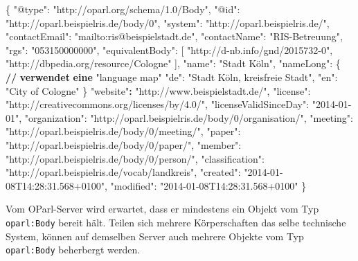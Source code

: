 \documentclass[,a4paper]{article}
\newenvironment{Shaded}{}{}
\newcommand{\DataTypeTok}[1]{\textcolor[rgb]{0.56,0.13,0.00}{{#1}}}
\newcommand{\StringTok}[1]{\textcolor[rgb]{0.25,0.44,0.63}{{#1}}}
\newcommand{\ErrorTok}[1]{\textcolor[rgb]{1.00,0.00,0.00}{\textbf{{#1}}}}
\newcommand{\NormalTok}[1]{{#1}}
\begin{document}
\begin{Shaded}
\begin{Highlighting}[]
\NormalTok{\{}
    \DataTypeTok{"@type"}\NormalTok{: }\StringTok{"http://oparl.org/schema/1.0/Body"}\NormalTok{,}
    \DataTypeTok{"@id"}\NormalTok{: }\StringTok{"http://oparl.beispielris.de/body/0"}\NormalTok{,}
    \DataTypeTok{"system"}\NormalTok{: }\StringTok{"http://oparl.beispielris.de/"}\NormalTok{,}
    \DataTypeTok{"contactEmail"}\NormalTok{: }\StringTok{"mailto:ris@beispielstadt.de"}\NormalTok{,}
    \DataTypeTok{"contactName"}\NormalTok{: }\StringTok{"RIS-Betreuung"}\NormalTok{,}
    \DataTypeTok{"rgs"}\NormalTok{: }\StringTok{"053150000000"}\NormalTok{,}
    \DataTypeTok{"equivalentBody"}\NormalTok{: [}
        \StringTok{"http://d-nb.info/gnd/2015732-0"}\NormalTok{,}
        \StringTok{"http://dbpedia.org/resource/Cologne"}
    \NormalTok{],}
    \DataTypeTok{"name"}\NormalTok{: }\StringTok{"Stadt Köln"}\NormalTok{,}
    \DataTypeTok{"nameLong"}\NormalTok{: \{ }\ErrorTok{//} \ErrorTok{verwendet} \ErrorTok{eine} \DataTypeTok{"language map"}
        \DataTypeTok{"de"}\NormalTok{: }\StringTok{"Stadt Köln, kreisfreie Stadt"}\NormalTok{,}
        \DataTypeTok{"en"}\NormalTok{: }\StringTok{"City of Cologne"}
    \NormalTok{\}}
    \StringTok{"website"}\ErrorTok{:} \StringTok{"http://www.beispielstadt.de/"}\NormalTok{,}
    \DataTypeTok{"license"}\NormalTok{: }\StringTok{"http://creativecommons.org/licenses/by/4.0/"}\NormalTok{,}
    \DataTypeTok{"licenseValidSinceDay"}\NormalTok{: }\StringTok{"2014-01-01"}\NormalTok{,}
    \DataTypeTok{"organization"}\NormalTok{: }\StringTok{"http://oparl.beispielris.de/body/0/organisation/"}\NormalTok{,}
    \DataTypeTok{"meeting"}\NormalTok{: }\StringTok{"http://oparl.beispielris.de/body/0/meeting/"}\NormalTok{,}
    \DataTypeTok{"paper"}\NormalTok{: }\StringTok{"http://oparl.beispielris.de/body/0/paper/"}\NormalTok{,}
    \DataTypeTok{"member"}\NormalTok{: }\StringTok{"http://oparl.beispielris.de/body/0/person/"}\NormalTok{,}
    \DataTypeTok{"classification"}\NormalTok{: }\StringTok{"http://oparl.beispielris.de/vocab/landkreis"}\NormalTok{,}
    \DataTypeTok{"created"}\NormalTok{: }\StringTok{"2014-01-08T14:28:31.568+0100"}\NormalTok{,}
    \DataTypeTok{"modified"}\NormalTok{: }\StringTok{"2014-01-08T14:28:31.568+0100"}
\NormalTok{\}}
\end{Highlighting}
\end{Shaded}

Vom OParl-Server wird erwartet, dass er mindestens ein Objekt vom Typ
\texttt{oparl:Body} bereit hält. Teilen sich mehrere Körperschaften das
selbe technische System, können auf demselben Server auch mehrere
Objekte vom Typ \texttt{oparl:Body} beherbergt werden.
\end{document}
